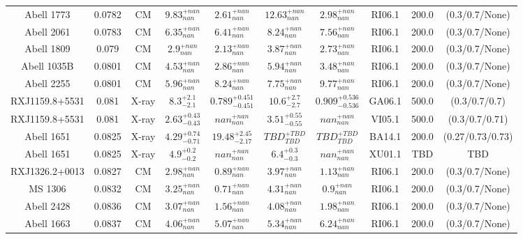 \begin{table}
\begin{tabular}{cccccccccc}
Abell 1773 & 0.0782 & CM & ${9.83}^{+nan}_{nan}$ & ${2.61}^{+nan}_{nan}$ & ${12.63}^{+nan}_{nan}$ & ${2.98}^{+nan}_{nan}$ & RI06.1 & 200.0 & (0.3/0.7/None) \\
Abell 2061 & 0.0783 & CM & ${6.35}^{+nan}_{nan}$ & ${6.41}^{+nan}_{nan}$ & ${8.24}^{+nan}_{nan}$ & ${7.56}^{+nan}_{nan}$ & RI06.1 & 200.0 & (0.3/0.7/None) \\
Abell 1809 & 0.079 & CM & ${2.9}^{+nan}_{nan}$ & ${2.13}^{+nan}_{nan}$ & ${3.87}^{+nan}_{nan}$ & ${2.73}^{+nan}_{nan}$ & RI06.1 & 200.0 & (0.3/0.7/None) \\
Abell 1035B & 0.0801 & CM & ${4.53}^{+nan}_{nan}$ & ${2.86}^{+nan}_{nan}$ & ${5.94}^{+nan}_{nan}$ & ${3.48}^{+nan}_{nan}$ & RI06.1 & 200.0 & (0.3/0.7/None) \\
Abell 2255 & 0.0801 & CM & ${5.96}^{+nan}_{nan}$ & ${8.24}^{+nan}_{nan}$ & ${7.75}^{+nan}_{nan}$ & ${9.77}^{+nan}_{nan}$ & RI06.1 & 200.0 & (0.3/0.7/None) \\
RXJ1159.8+5531 & 0.081 & X-ray & ${8.3}^{+2.1}_{-2.1}$ & ${0.789}^{+0.451}_{-0.451}$ & ${10.6}^{+2.7}_{-2.7}$ & ${0.909}^{+0.536}_{-0.536}$ & GA06.1 & 500.0 & (0.3/0.7/0.7) \\
RXJ1159.8+5531 & 0.081 & X-ray & ${2.63}^{+0.43}_{-0.43}$ & ${nan}^{+nan}_{nan}$ & ${3.51}^{+0.55}_{-0.55}$ & ${nan}^{+nan}_{nan}$ & VI05.1 & 500.0 & (0.3/0.7/0.71) \\
Abell 1651 & 0.0825 & X-ray & ${4.29}^{+0.74}_{-0.71}$ & ${19.48}^{+2.45}_{-2.17}$ & ${TBD}^{+TBD}_{TBD}$ & ${TBD}^{+TBD}_{TBD}$ & BA14.1 & 200.0 & (0.27/0.73/0.73) \\
Abell 1651 & 0.0825 & X-ray & ${4.9}^{+0.2}_{-0.2}$ & ${nan}^{+nan}_{nan}$ & ${6.4}^{+0.3}_{-0.3}$ & ${nan}^{+nan}_{nan}$ & XU01.1 & TBD & TBD \\
RXJ1326.2+0013 & 0.0827 & CM & ${2.98}^{+nan}_{nan}$ & ${0.89}^{+nan}_{nan}$ & ${3.97}^{+nan}_{nan}$ & ${1.13}^{+nan}_{nan}$ & RI06.1 & 200.0 & (0.3/0.7/None) \\
MS 1306 & 0.0832 & CM & ${3.25}^{+nan}_{nan}$ & ${0.71}^{+nan}_{nan}$ & ${4.31}^{+nan}_{nan}$ & ${0.9}^{+nan}_{nan}$ & RI06.1 & 200.0 & (0.3/0.7/None) \\
Abell 2428 & 0.0836 & CM & ${3.07}^{+nan}_{nan}$ & ${1.56}^{+nan}_{nan}$ & ${4.08}^{+nan}_{nan}$ & ${1.98}^{+nan}_{nan}$ & RI06.1 & 200.0 & (0.3/0.7/None) \\
Abell 1663 & 0.0837 & CM & ${4.06}^{+nan}_{nan}$ & ${5.07}^{+nan}_{nan}$ & ${5.34}^{+nan}_{nan}$ & ${6.24}^{+nan}_{nan}$ & RI06.1 & 200.0 & (0.3/0.7/None) \\

\end{tabular}
\end{table}
